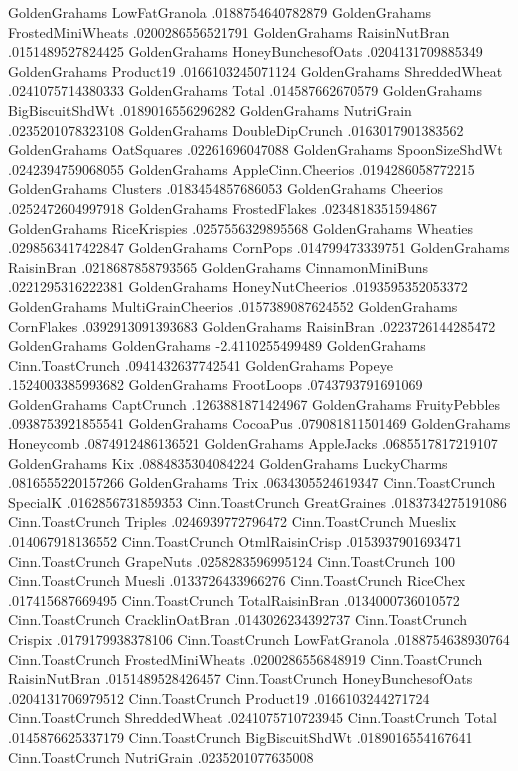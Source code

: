 GoldenGrahams	LowFatGranola	.0188754640782879
GoldenGrahams	FrostedMiniWheats	.0200286556521791
GoldenGrahams	RaisinNutBran	.0151489527824425
GoldenGrahams	HoneyBunchesofOats	.0204131709885349
GoldenGrahams	Product19	.0166103245071124
GoldenGrahams	ShreddedWheat	.0241075714380333
GoldenGrahams	Total	.014587662670579
GoldenGrahams	BigBiscuitShdWt	.0189016556296282
GoldenGrahams	NutriGrain	.0235201078323108
GoldenGrahams	DoubleDipCrunch	.0163017901383562
GoldenGrahams	OatSquares	.02261696047088
GoldenGrahams	SpoonSizeShdWt	.0242394759068055
GoldenGrahams	AppleCinn.Cheerios	.0194286058772215
GoldenGrahams	Clusters	.0183454857686053
GoldenGrahams	Cheerios	.0252472604997918
GoldenGrahams	FrostedFlakes	.0234818351594867
GoldenGrahams	RiceKrispies	.0257556329895568
GoldenGrahams	Wheaties	.0298563417422847
GoldenGrahams	CornPops	.014799473339751
GoldenGrahams	RaisinBran	.0218687858793565
GoldenGrahams	CinnamonMiniBuns	.0221295316222381
GoldenGrahams	HoneyNutCheerios	.0193595352053372
GoldenGrahams	MultiGrainCheerios	.0157389087624552
GoldenGrahams	CornFlakes	.0392913091393683
GoldenGrahams	RaisinBran	.0223726144285472
GoldenGrahams	GoldenGrahams	-2.4110255499489
GoldenGrahams	Cinn.ToastCrunch	.0941432637742541
GoldenGrahams	Popeye	.1524003385993682
GoldenGrahams	FrootLoops	.0743793791691069
GoldenGrahams	CaptCrunch	.1263881871424967
GoldenGrahams	FruityPebbles	.0938753921855541
GoldenGrahams	CocoaPus	.079081811501469
GoldenGrahams	Honeycomb	.0874912486136521
GoldenGrahams	AppleJacks	.0685517817219107
GoldenGrahams	Kix	.0884835304084224
GoldenGrahams	LuckyCharms	.0816555220157266
GoldenGrahams	Trix	.0634305524619347
Cinn.ToastCrunch	SpecialK	.0162856731859353
Cinn.ToastCrunch	GreatGraines	.0183734275191086
Cinn.ToastCrunch	Triples	.0246939772796472
Cinn.ToastCrunch	Mueslix	.014067918136552
Cinn.ToastCrunch	OtmlRaisinCrisp	.0153937901693471
Cinn.ToastCrunch	GrapeNuts	.0258283596995124
Cinn.ToastCrunch	100%
Cinn.ToastCrunch	Muesli	.0133726433966276
Cinn.ToastCrunch	RiceChex	.017415687669495
Cinn.ToastCrunch	TotalRaisinBran	.0134000736010572
Cinn.ToastCrunch	CracklinOatBran	.0143026234392737
Cinn.ToastCrunch	Crispix	.0179179938378106
Cinn.ToastCrunch	LowFatGranola	.0188754638930764
Cinn.ToastCrunch	FrostedMiniWheats	.0200286556848919
Cinn.ToastCrunch	RaisinNutBran	.0151489528426457
Cinn.ToastCrunch	HoneyBunchesofOats	.0204131706979512
Cinn.ToastCrunch	Product19	.0166103244271724
Cinn.ToastCrunch	ShreddedWheat	.0241075710723945
Cinn.ToastCrunch	Total	.0145876625337179
Cinn.ToastCrunch	BigBiscuitShdWt	.0189016554167641
Cinn.ToastCrunch	NutriGrain	.0235201077635008
